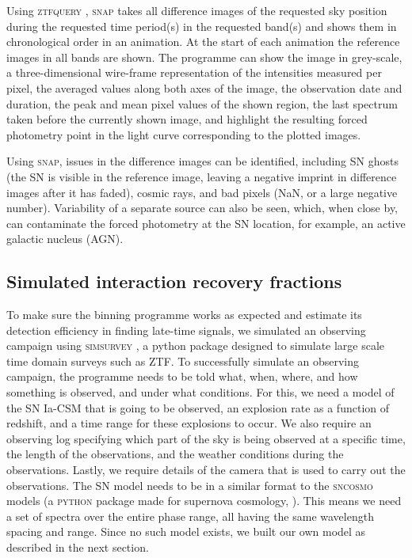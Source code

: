 \documentclass[a4paper,oneside,12pt, class=Latex/Classes/PhDthesisPSnPDF, crop=false]{standalone}
\begin{document}
Using \textsc{ztfquery} \citep{ZTFquery}, \textsc{snap} takes all difference images of the requested sky position during the requested time period(s) in the requested band(s) and shows them in chronological order in an animation. At the start of each animation the reference images in all bands are shown. The programme can show the image in grey-scale, a three-dimensional wire-frame representation of the intensities measured per pixel, the averaged values along both axes of the image, the observation date and duration, the peak and mean pixel values of the shown region, the last spectrum taken before the currently shown image, and highlight the resulting forced photometry point in the light curve corresponding to the plotted images.

Using \textsc{snap}, issues in the difference images can be identified, including SN ghosts (the SN is visible in the reference image, leaving a negative imprint in difference images after it has faded), cosmic rays, and bad pixels (NaN, or a large negative number). Variability of a separate source can also be seen, which, when close by, can contaminate the forced photometry at the SN location, for example, an active galactic nucleus (AGN).


\subsection{Simulated interaction recovery fractions}
\label{simulation}
To make sure the binning programme works as expected and estimate its detection efficiency in finding late-time signals, we simulated an observing campaign using \textsc{simsurvey} \citep{simsurvey, simsurvey_main}, a python package designed to simulate large scale time domain surveys such as ZTF. To successfully simulate an observing campaign, the programme needs to be told what, when, where, and how something is observed, and under what conditions. For this, we need a model of the SN Ia-CSM that is going to be observed, an explosion rate as a function of redshift, and a time range for these explosions to occur. We also require an observing log specifying which part of the sky is being observed at a specific time, the length of the observations, and the weather conditions during the observations. Lastly, we require details of the camera that is used to carry out the observations. The SN model needs to be in a similar format to the \textsc{sncosmo} models (a \textsc{python} package made for supernova cosmology, \citealt{sncosmo}). This means we need a set of spectra over the entire phase range, all having the same wavelength spacing and range. Since no such model exists, we built our own model as described in the next section.
\end{document}
